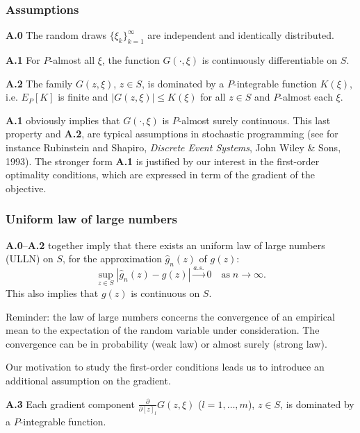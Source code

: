 \documentclass{beamer}
\begin{document}
\begin{frame}
\frametitle{Assumptions}

\noindent
\textbf{A.0}
The random draws $\lbrace \xi_k \rbrace_{k= 1}^{\infty}$ are independent and identically distributed.

\mbox{}

\noindent
\textbf{A.1}
For $P$-almost all $\xi$, the function $G(\cdot, \xi)$ is continuously differentiable on $S$.

\mbox{}

\noindent
\textbf{A.2}
The family $G(z, \xi)$, $z \in S$, is dominated by a $P$-integrable function $K(\xi)$, i.e. $E_P[K]$ is finite and $| G(z, \xi) | \leq K(\xi)$ for all $z \in S$ and $P$-almost each $\xi$.

\mbox{}

\noindent
\textbf{A.1} obviously implies that $G(\cdot, \xi)$ is $P$-almost surely continuous.
This last property and \textbf{A.2}, are typical assumptions in stochastic programming (see for instance Rubinstein and Shapiro, {\sl Discrete Event Systems}, John Wiley \& Sons, 1993).
The stronger form \textbf{A.1} is justified by our interest in the first-order optimality conditions, which are expressed in term of the gradient of the objective.

\end{frame}

\begin{frame}
\frametitle{Uniform law of large numbers}

\textbf{A.0}--\textbf{A.2} together imply that there exists an {\blue uniform law of large numbers (ULLN)} on $S$, for the approximation $\hat{g}_n(z)$ of $g(z)$:%
\[
\sup_{z \in S} \left| \hat{g}_n(z) - g(z) \right|
\overset{a.s.}{\longrightarrow} 0
\quad \mbox{as} \; n \rightarrow \infty.
\]
This also implies that $g(z)$ is continuous on $S$.

\mbox{}

\begin{footnotesize}
Reminder: the law of large numbers concerns the convergence of an empirical mean to the expectation of the random variable under consideration.
The convergence can be in probability (weak law) or almost surely (strong law).
\end{footnotesize}

\mbox{}

Our motivation to study the first-order conditions leads us to introduce an additional assumption on the gradient.

\mbox{}

\noindent
\textbf{A.3}
Each gradient component $\frac{\partial}{\partial [z]_l} G(z, \xi)$ ($l = 1,\ldots,m$), $z \in S$, is dominated by a $P$-integrable function.

\end{frame}
\end{document}
